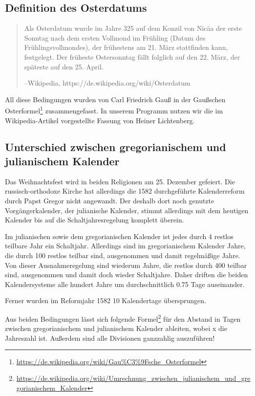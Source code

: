 \subsection{Definition des Osterdatums}
	\begin{quote}
		Als Osterdatum wurde im Jahre 325 auf dem Konzil von Nicäa der erste Sonntag nach dem ersten Vollmond im Frühling (Datum des Frühlingsvollmondes), der frühestens am 21. März stattfinden kann, festgelegt. Der früheste Ostersonntag fällt folglich auf den 22. März, der späteste auf den 25. April.

		\hfill{}--Wikipedia, https://de.wikipedia.org/wiki/Osterdatum
	\end{quote}

	All diese Bedingungen wurden von Carl Friedrich Gauß in der Gaußschen Osterformel\footnote{\url{https://de.wikipedia.org/wiki/Gau\%C3\%9Fsche_Osterformel}} zusammengefasst. In unserem Programm nutzen wir die im Wikipedia-Artikel vorgestellte Fassung von Heiner Lichtenberg.
\subsection{Unterschied zwischen gregorianischem und julianischem Kalender}
	Das Weihnachtsfest wird in beiden Religionen am 25. Dezember gefeiert. Die russisch-orthodoxe Kirche hat allerdings die 1582 durchgeführte Kalenderreform durch Papst Gregor nicht angewandt. Der deshalb dort noch genutzte Vorgängerkalender, der julianische Kalender, stimmt allerdings mit dem heutigen Kalender bis auf die Schaltjahresregelung komplett überein.

	Im julianischen sowie dem gregorianischen Kalender ist jedes durch 4 restlos teilbare Jahr ein Schaltjahr. Allerdings sind im gregorianischem Kalender Jahre, die durch 100 restlos teilbar sind, ausgenommen und damit regelmäßige Jahre. Von dieser Ausnahmeregelung sind wiederum Jahre, die restlos durch 400 teilbar sind, ausgenommen und damit doch wieder Schaltjahre. Daher driften die beiden Kalendersysteme alle hundert Jahre um durchschnittlich 0.75 Tage auseinander.

	Ferner wurden im Reformjahr 1582 10 Kalendertage übersprungen.

	Aus beiden Bedingungen lässt sich folgende Formel\footnote{\url{https://de.wikipedia.org/wiki/Umrechnung_zwischen_julianischem_und_gregorianischem_Kalender}} für den Abstand in Tagen zwischen gregorianischem und julianischem Kalender ableiten, wobei x die Jahreszahl ist. Außerdem sind  alle Divisionen ganzzahlig auszuführen! 

